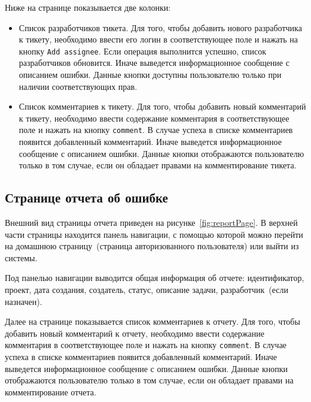 Ниже на странице показывается две колонки:
\begin{itemize}
\item Список разработчиков тикета. Для того, чтобы добавить нового разработчика к тикету, необходимо ввести его логин в соответствующее поле и нажать на кнопку \texttt{Add assignee}. Если операция выполнится успешно, список разработчиков обновится. Иначе выведется информационное сообщение с описанием ошибки. Данные кнопки доступны пользователю только при наличии соответствующих прав.

\item Список комментариев к тикету. Для того, чтобы добавить новый комментарий к тикету, необходимо ввести содержание комментария в соответствующее поле и нажать на кнопку \texttt{comment}. В случае успеха в списке комментариев появится добавленный комментарий. Иначе выведется информационное сообщение с описанием ошибки. Данные кнопки отображаются пользователю только в том случае, если он обладает правами на комментирование тикета.
\end{itemize}

\subsection{Странице отчета об ошибке}
Внешний вид страницы отчета приведен на рисунке~\ref{fig:reportPage}. В верхней части страницы находится панель навигации, с помощью которой можно перейти на домашнюю страницу~(страница авторизованного пользователя) или выйти из системы. 

Под панелью навигации выводится общая информация об отчете: идентификатор, проект, дата создания, создатель, статус, описание задачи, разработчик~(если назначен).

Далее на странице показывается список комментариев к отчету. Для того, чтобы добавить новый комментарий к отчету, необходимо ввести содержание комментария в соответствующее поле и нажать на кнопку \texttt{comment}. В случае успеха в списке комментариев появится добавленный комментарий. Иначе выведется информационное сообщение с описанием ошибки. Данные кнопки отображаются пользователю только в том случае, если он обладает правами на комментирование отчета.


